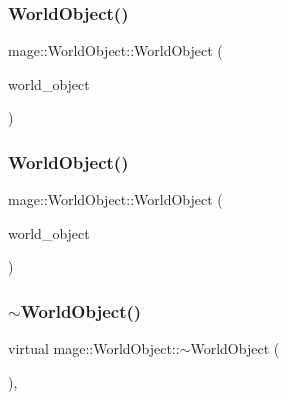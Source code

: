 \hypertarget{classmage_1_1_world_object_a4e7ace41518b45c75d975c766de28143}{}\label{classmage_1_1_world_object_a4e7ace41518b45c75d975c766de28143} 
\subsubsection{\texorpdfstring{World\+Object()}{WorldObject()}\hspace{0.1cm}{\footnotesize\ttfamily [2/3]}}
{\footnotesize\ttfamily mage\+::\+World\+Object\+::\+World\+Object (\begin{DoxyParamCaption}\item[{const \hyperlink{classmage_1_1_world_object}{World\+Object} \&}]{world\+\_\+object }\end{DoxyParamCaption})}

\hypertarget{classmage_1_1_world_object_af8e2a82bd8a59d1ec8776e27ed5900cd}{}\label{classmage_1_1_world_object_af8e2a82bd8a59d1ec8776e27ed5900cd} 
\subsubsection{\texorpdfstring{World\+Object()}{WorldObject()}\hspace{0.1cm}{\footnotesize\ttfamily [3/3]}}
{\footnotesize\ttfamily mage\+::\+World\+Object\+::\+World\+Object (\begin{DoxyParamCaption}\item[{\hyperlink{classmage_1_1_world_object}{World\+Object} \&\&}]{world\+\_\+object }\end{DoxyParamCaption})\hspace{0.3cm}{\ttfamily [default]}}

\hypertarget{classmage_1_1_world_object_a6ae28ad98832c1e97b681816755a79f2}{}\label{classmage_1_1_world_object_a6ae28ad98832c1e97b681816755a79f2} 
\subsubsection{\texorpdfstring{$\sim$\+World\+Object()}{~WorldObject()}}
{\footnotesize\ttfamily virtual mage\+::\+World\+Object\+::$\sim$\+World\+Object (\begin{DoxyParamCaption}{ }\end{DoxyParamCaption})\hspace{0.3cm}{\ttfamily [virtual]}, {\ttfamily [default]}}



